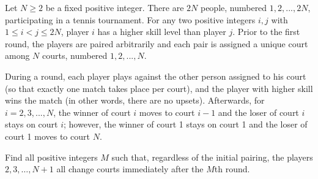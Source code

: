 Let $N\ge2$ be a fixed positive integer. There are $2N$ people, numbered $1,2,...,2N$, participating in a tennis tournament.  For any two positive integers $i,j$ with $1\le i<j\le 2N$, player $i$ has a higher skill level than player $j$. Prior to the first round, the players are paired arbitrarily and each pair is assigned a unique court among $N$ courts, numbered $1,2,...,N$.

During a round, each player plays against the other person assigned to his court (so that exactly one match takes place per court), and the player with higher skill wins the match (in other words, there are no upsets).  Afterwards, for $i=2,3,...,N$, the winner of court $i$ moves to court $i-1$ and the loser of court $i$ stays on court $i$; however, the winner of court 1 stays on court 1 and the loser of court 1 moves to court $N$.

Find all positive integers $M$ such that, regardless of the initial pairing, the players $2, 3, \ldots, N+1$ all change courts immediately after the $M$th round.

